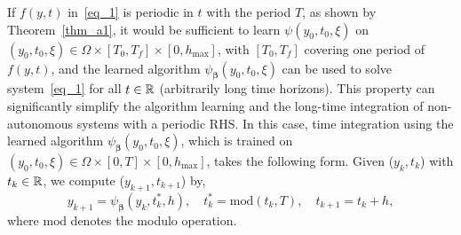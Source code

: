 \begin{remark}\label{rem_29}
  If $f(y,t)$ in~\eqref{eq_1}
  is periodic in $t$ with the period $T$, as shown by Theorem~\ref{thm_a1},
  it would be sufficient to learn $\psi(y_0,t_0,\xi)$
  on $(y_0,t_0,\xi)\in\Omega\times[T_0,T_f]\times[0,h_{\max}]$,
  with $[T_0,T_f]$ covering  one period of $f(y,t)$,
  and the learned algorithm $\psi_{\bm\beta}(y_0,t_0,\xi)$ can be used to solve
  system~\eqref{eq_1} for all $t\in\mathbb{R}$ (arbitrarily long
  time horizons). This property can significantly simplify
  the algorithm learning and the long-time integration of
  non-autonomous systems with a  periodic RHS.
  In this case,
  time integration using the learned algorithm
  $\psi_{\bm\beta}(y_0,t_0,\xi)$, which is trained on
  $(y_0,t_0,\xi)\in\Omega\times[0,T]\times[0,h_{\max}]$, takes the following
  form. Given ($y_k,t_k$) with $t_k\in\mathbb{R}$, we compute
  ($y_{k+1},t_{k+1}$) by,
  \begin{equation}\label{eq_46}
    y_{k+1} = \psi_{\bm\beta}(y_k,t_k^*,h), \quad
    t_k^* = \mathrm{mod}(t_k,T), \quad
    t_{k+1} = t_k+h,
  \end{equation}
  where $\mathrm{mod}$ denotes the modulo operation.
  
\end{remark}

